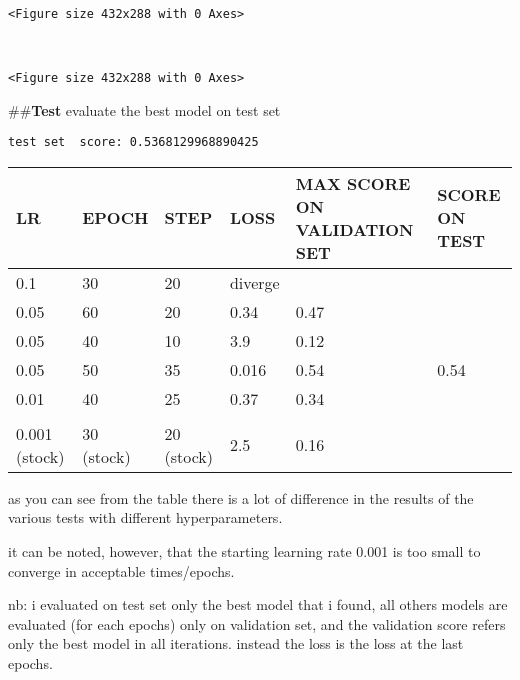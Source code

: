 \documentclass[11pt]{article}
\begin{document}
    \begin{center}
    \end{center}
    { \hspace*{\fill} \\}
    
    
    \begin{verbatim}
<Figure size 432x288 with 0 Axes>
    \end{verbatim}

    
    \begin{center}
    \end{center}
    { \hspace*{\fill} \\}
    
    
    \begin{verbatim}
<Figure size 432x288 with 0 Axes>
    \end{verbatim}

    
    \#\#\textbf{Test} evaluate the best model on test set

    \begin{Verbatim}[commandchars=\\\{\}]
 test set  score: 0.5368129968890425
\end{Verbatim}

    \begin{longtable}[]{@{}llllll@{}}
\toprule
LR & EPOCH & STEP & LOSS & MAX SCORE ON VALIDATION SET & SCORE ON
TEST\tabularnewline
\midrule
\endhead
0.1 & 30 & 20 & diverge & &\tabularnewline
0.05 & 60 & 20 & 0.34 & 0.47 &\tabularnewline
0.05 & 40 & 10 & 3.9 & 0.12 &\tabularnewline
0.05 & 50 & 35 & 0.016 & 0.54 & 0.54\tabularnewline
0.01 & 40 & 25 & 0.37 & 0.34 &\tabularnewline
& & & & &\tabularnewline
0.001 (stock) & 30 (stock) & 20 (stock) & 2.5 & 0.16 &\tabularnewline
\bottomrule
\end{longtable}

as you can see from the table there is a lot of difference in the
results of the various tests with different hyperparameters.

it can be noted, however, that the starting learning rate 0.001 is too
small to converge in acceptable times/epochs.

nb: i evaluated on test set only the best model that i found, all others
models are evaluated (for each epochs) only on validation set, and the
validation score refers only the best model in all iterations. instead
the loss is the loss at the last epochs.
\end{document}
